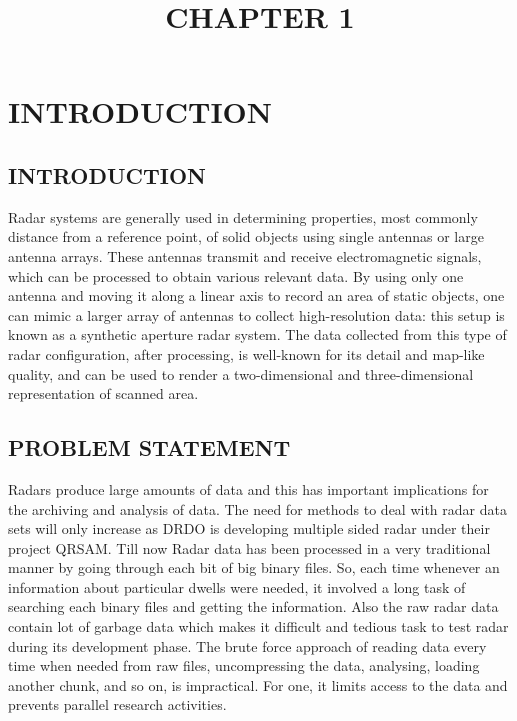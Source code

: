 \documentclass[14pt]{article} %
\begin{document}
\tableofcontents

\pagebreak
\title{CHAPTER 1}
\maketitle
\section{INTRODUCTION}

\subsection{INTRODUCTION}
         Radar systems are generally used in determining properties, most commonly distance from a reference point, of solid objects using single antennas or large antenna arrays. These antennas transmit and receive electromagnetic signals, which can be processed to obtain various relevant data. By using only one antenna and moving it along a linear axis to record an area of static objects, one can mimic a larger array of antennas to collect high-resolution data: this setup is known as a synthetic aperture radar system. The data collected from this type of radar configuration, after processing, is well-known for its detail and map-like quality, and can be used to render a two-dimensional and three-dimensional representation of scanned area.

\subsection{PROBLEM STATEMENT}
           Radars produce large amounts of data and this has important implications for the archiving and analysis of data. The need for methods to deal with radar data sets will only increase as DRDO is developing multiple sided radar under their project QRSAM. Till now Radar data has been processed in a very traditional manner by going through each bit of big binary files. So, each time whenever an information about particular dwells were needed, it involved a long task of searching each binary files and getting the information. Also the raw radar data contain lot of garbage data which makes it difficult and tedious task to test radar during its development phase. The brute force approach of reading data every time when needed from raw files, uncompressing the data, analysing, loading another chunk, and so on, is impractical. For one, it limits access to the data and prevents parallel research activities.
\end{document}
